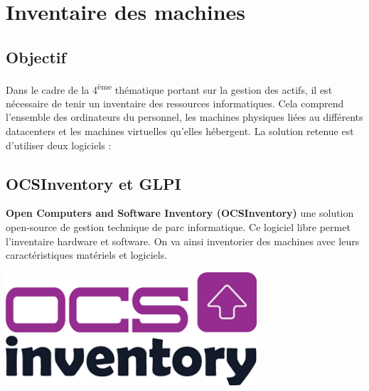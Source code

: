 \documentclass[12pt, a4paper, twoside]{article}
\begin{document}
\newpage
\section{Inventaire des machines}
\subsection{Objectif}

Dans le cadre de la 4\textsuperscript{ème} thématique portant sur la gestion des actifs, il est nécessaire de tenir un inventaire des ressources informatiques. 
Cela comprend l'ensemble des ordinateurs du personnel, les machines physiques liées au différents datacenters et les machines virtuelles qu'elles hébergent.
La solution retenue est d'utiliser deux logiciels :

\subsection{OCSInventory et GLPI}
\begin{minipage}{.7\textwidth}%
\textbf{Open Computers and Software Inventory (\gls{OCSInventory})} une solution open-source de gestion technique de parc informatique. 
Ce logiciel libre permet l’inventaire hardware et software. 
On va ainsi inventorier des machines avec leurs caractéristiques matériels et logiciels.
\end{minipage}%
\hfill
\begin{minipage}{.3\textwidth}%
\begin{center}
\includegraphics[width=0.7\textwidth]{src/logo_ocsinventory.png}
\end{center}
\end{minipage}%
\end{document}
